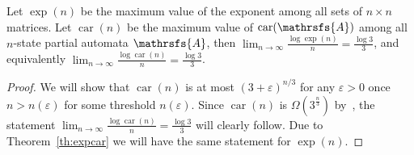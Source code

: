 \documentclass[a4paper,USenglish]{lipics}
\DeclareMathOperator{\car}{car}
\theoremstyle{definition}
\begin{document}
\begin{theorem}
\label{th:newBound}
Let $\exp (n)$ be the maximum value of the exponent among all sets of $n \times n$ matrices. Let $\car(n)$ be the maximum value of $\car(\mathrsfs{A})$ among all $n$-state partial automata $\mathrsfs{A}$, then $\lim_{n\rightarrow\infty} \tfrac{\log \exp(n)}{n} = \tfrac{\log 3}{3}$, and equivalently $\lim_{n\rightarrow\infty} \tfrac{\log \car(n)}{n} = \tfrac{\log 3}{3}$.
\end{theorem}
\begin{proof}
We will show that $\car(n)$ is at most $(3+ \varepsilon)^{n/3}$ for any $\varepsilon >0$ once $n>n(\varepsilon)$ for some threshold $n(\varepsilon)$. Since $\car(n)$ is $\Omega(3^{\frac{n}{3}})$ by~\cite{Mart2010}, the statement $\lim_{n\rightarrow\infty} \tfrac{\log \car(n)}{n} = \tfrac{\log 3}{3}$ will clearly follow. Due to Theorem~\ref{th:expcar} we will have the same statement for $\exp(n)$.







\end{proof}
\end{document}
